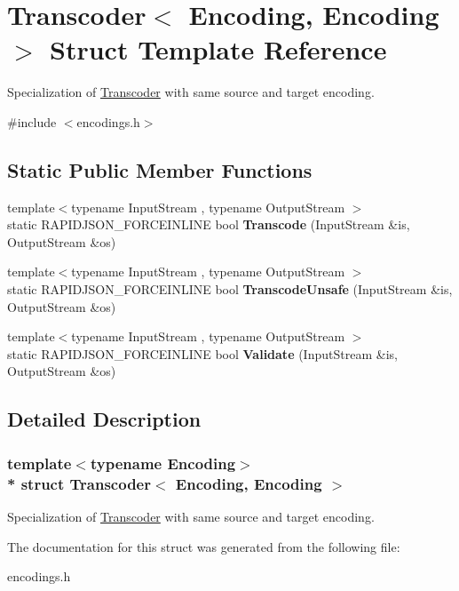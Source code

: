 \hypertarget{a00309}{}\section{Transcoder$<$ Encoding, Encoding $>$ Struct Template Reference}
\label{a00309}


Specialization of \hyperlink{a00308}{Transcoder} with same source and target encoding.  




{\ttfamily \#include $<$encodings.\+h$>$}

\subsection*{Static Public Member Functions}
\begin{DoxyCompactItemize}
\item 
{\footnotesize template$<$typename Input\+Stream , typename Output\+Stream $>$ }\\static R\+A\+P\+I\+D\+J\+S\+O\+N\+\_\+\+F\+O\+R\+C\+E\+I\+N\+L\+I\+NE bool {\bfseries Transcode} (Input\+Stream \&is, Output\+Stream \&os)\hypertarget{a00309_aad11cdc2b829123a7b9969e34d456813}{}\label{a00309_aad11cdc2b829123a7b9969e34d456813}

\item 
{\footnotesize template$<$typename Input\+Stream , typename Output\+Stream $>$ }\\static R\+A\+P\+I\+D\+J\+S\+O\+N\+\_\+\+F\+O\+R\+C\+E\+I\+N\+L\+I\+NE bool {\bfseries Transcode\+Unsafe} (Input\+Stream \&is, Output\+Stream \&os)\hypertarget{a00309_addf67decfff7d0de510c47842eb53cef}{}\label{a00309_addf67decfff7d0de510c47842eb53cef}

\item 
{\footnotesize template$<$typename Input\+Stream , typename Output\+Stream $>$ }\\static R\+A\+P\+I\+D\+J\+S\+O\+N\+\_\+\+F\+O\+R\+C\+E\+I\+N\+L\+I\+NE bool {\bfseries Validate} (Input\+Stream \&is, Output\+Stream \&os)\hypertarget{a00309_a536aa3930251161d05e112947ec2f9c8}{}\label{a00309_a536aa3930251161d05e112947ec2f9c8}

\end{DoxyCompactItemize}


\subsection{Detailed Description}
\subsubsection*{template$<$typename Encoding$>$\\*
struct Transcoder$<$ Encoding, Encoding $>$}

Specialization of \hyperlink{a00308}{Transcoder} with same source and target encoding. 

The documentation for this struct was generated from the following file\+:\begin{DoxyCompactItemize}
\item 
encodings.\+h\end{DoxyCompactItemize}
